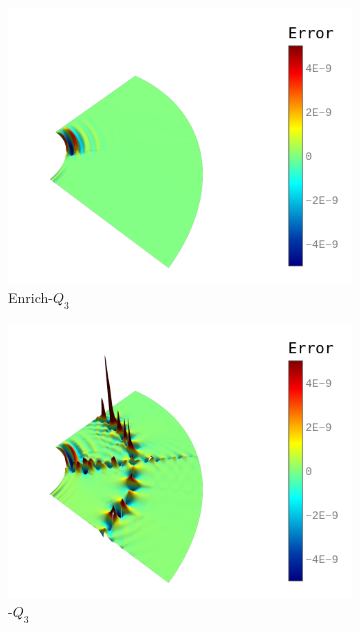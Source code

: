 \begin{figure}[ht]
	\center
	\captionsetup[subfigure]{labelformat=empty}
	\begin{subfigure}[t]{.45\linewidth}
		\center
		\includegraphics[scale=.4]{op_annular}
		\caption{Enrich-$Q_3$}
	\end{subfigure}
	\begin{subfigure}[t]{.45\linewidth}
		\center
		\includegraphics[scale=.4]{bezier_annular}
		\caption{\Bezier-$Q_3$}
	\end{subfigure}\\
	\center
	\begin{subfigure}[t]{.45\linewidth}

\end{subfigure}
\end{figure}
